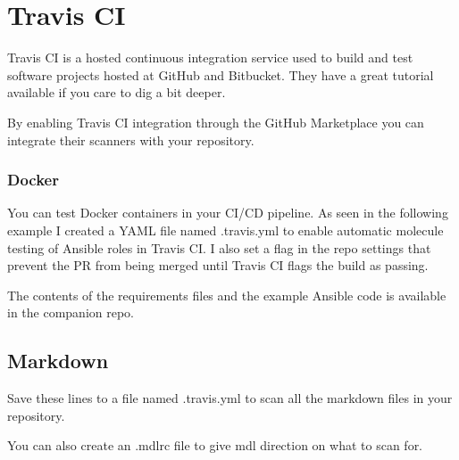 \justify{}
%	 

\section{Travis CI}

\justify{}
Travis CI is a hosted continuous integration service used to build and
test software projects hosted at GitHub and Bitbucket. They have a great
tutorial available if you care to dig a bit deeper.

\justify{}
By enabling Travis CI integration through the GitHub Marketplace you
can integrate their scanners with your repository.

\subsubsection{Docker}

\justify{}
You can test Docker containers in your CI/CD pipeline. As seen in the
following example I created a YAML file named .travis.yml to enable
automatic molecule testing of Ansible roles in Travis CI. I also set a
flag in the repo settings that prevent the PR from being merged until
Travis CI flags the build as passing.

%	
\justify{}
The contents of the requirements files and the example Ansible code is
available in the companion repo.


\subsection{Markdown}
\justify{}
Save these lines to a file named .travis.yml to scan all the markdown files in your
repository.

%	

\justify{}
You can also create an .mdlrc file to give mdl direction on what to scan for.

%	

